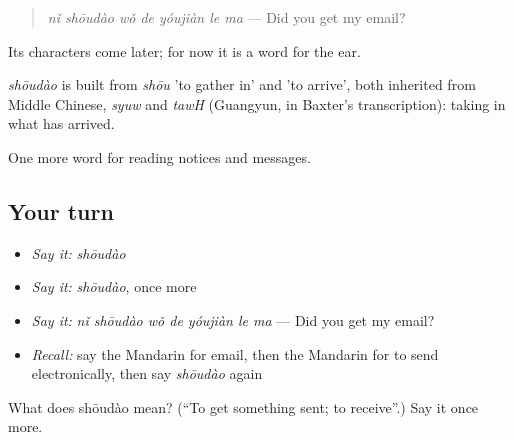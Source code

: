 \begin{quote}
\emph{nǐ shōudào wǒ de yóujiàn le ma} — Did you get my email?
\end{quote}

Its characters come later; for now it is a word for the ear.

\begin{cousinweb}
\emph{shōudào} is built from \emph{shōu} 'to gather in' and  'to arrive', both inherited from Middle Chinese, \emph{syuw} and \emph{tawH} (Guangyun, in Baxter's transcription): taking in what has arrived.
\end{cousinweb}

\begin{grammarlens}[title={What you've built}]
One more word for reading notices and messages.
\end{grammarlens}

\subsection*{Your turn}
\begin{itemize}
\raggedright
  \item \emph{Say it:} \emph{shōudào}
  \item \emph{Say it:} \emph{shōudào}, once more
  \item \emph{Say it:} \emph{nǐ shōudào wǒ de yóujiàn le ma} — Did you get my email?
  \item \emph{Recall:} say the Mandarin for email, then the Mandarin for to send electronically, then say \emph{shōudào} again
\end{itemize}

\begin{tcolorbox}[breakable,colback=teal!4,colframe=teal!35!black,title={Before you move on}]
What does shōudào mean? (\textquotedblleft{}To get something sent; to receive\textquotedblright{}.) Say it once more.
\end{tcolorbox}
